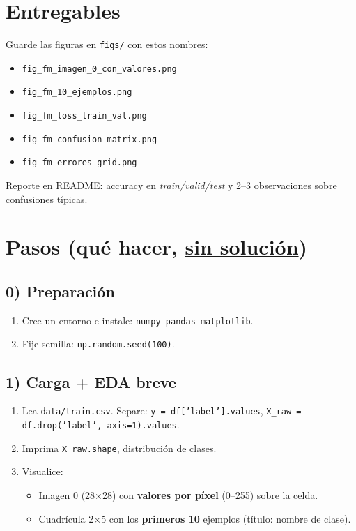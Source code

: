 \documentclass[12pt,a4paper]{article}
\begin{document}
\section*{Entregables}
Guarde las figuras en \texttt{figs/} con estos nombres:
\begin{itemize}[leftmargin=*,nosep]
  \item \texttt{fig\_fm\_imagen\_0\_con\_valores.png}
  \item \texttt{fig\_fm\_10\_ejemplos.png}
  \item \texttt{fig\_fm\_loss\_train\_val.png}
  \item \texttt{fig\_fm\_confusion\_matrix.png}
  \item \texttt{fig\_fm\_errores\_grid.png}
\end{itemize}
Reporte en README: accuracy en \textit{train/valid/test} y 2--3 observaciones sobre confusiones típicas.

\section*{Pasos (qué hacer, \underline{sin solución})}

\subsection*{0) Preparación}
\begin{enumerate}[leftmargin=*,nosep,label=\arabic*)]
  \item Cree un entorno e instale: \texttt{numpy pandas matplotlib}.
  \item Fije semilla: \texttt{np.random.seed(100)}.
\end{enumerate}

\subsection*{1) Carga + EDA breve}
\begin{enumerate}[leftmargin=*,nosep,label=\alph*)]
  \item Lea \texttt{data/train.csv}. Separe: \texttt{y = df['label'].values}, \texttt{X\_raw = df.drop('label', axis=1).values}.
  \item Imprima \texttt{X\_raw.shape}, distribución de clases.
  \item Visualice:
    \begin{itemize}[leftmargin=*,nosep]
      \item Imagen 0 (28$\times$28) con \textbf{valores por píxel} (0--255) sobre la celda.
      \item Cuadrícula 2$\times$5 con los \textbf{primeros 10} ejemplos (título: nombre de clase).
    \end{itemize}
\end{enumerate}
\end{document}

